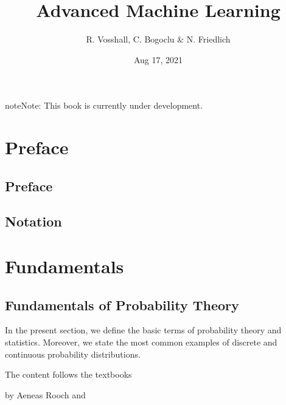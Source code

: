 \documentclass[letterpaper,10pt,english]{jupyterBook}
\title{Advanced Machine Learning}
\date{Aug 17, 2021}
\author{R.\@{} Vosshall, C.\@{} Bogoclu \& N.\@{} Friedlich}
\begin{document}
\pagestyle{empty}
\sphinxmaketitle
\pagestyle{plain}
\sphinxtableofcontents
\pagestyle{normal}
\label{\detokenize{welcome::doc}}


\begin{sphinxadmonition}{note}{Note:}
\sphinxAtStartPar
This book is currently under development.
\end{sphinxadmonition}


\part{Preface}


\chapter{Preface}
\label{\detokenize{preface/preface:preface}}\label{\detokenize{preface/preface::doc}}

\chapter{Notation}
\label{\detokenize{preface/notation:notation}}\label{\detokenize{preface/notation::doc}}

\part{Fundamentals}


\chapter{Fundamentals of Probability Theory}
\label{\detokenize{fund/fundprob:fundamentals-of-probability-theory}}\label{\detokenize{fund/fundprob::doc}}
\sphinxAtStartPar
In the present section, we define the basic terms of probability theory and statistics. Moreover, we state the most common examples of discrete and continuous probability distributions.

\sphinxAtStartPar
The content follows the textbooks

\sphinxAtStartPar
{}

\sphinxAtStartPar
by Aeneas Rooch and

\sphinxAtStartPar
{}
\end{document}
